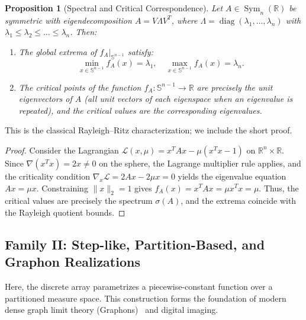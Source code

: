 \documentclass[11pt,a4paper,reqno]{amsart}
\newtheorem{proposition}[theorem]{Proposition}
\theoremstyle{definition}
\numberwithin{equation}{section}
\newcommand{\R}{\mathbb{R}}
\newcommand{\Sph}{\mathbb{S}}
\begin{document}
\begin{proposition}[Spectral and Critical Correspondence]
Let $A \in \operatorname{Sym}_n(\R)$ be symmetric with eigendecomposition $A = V \Lambda V^T$, where $\Lambda = \operatorname{diag}(\lambda_1, \dots, \lambda_n)$ with $\lambda_1 \le \lambda_2 \le \dots \le \lambda_n$. Then:
\begin{enumerate}[label=(\roman*)]
    \item The global extrema of $f_A|_{\Sph^{n-1}}$ satisfy:
    \begin{equation}
        \min_{x \in \Sph^{n-1}} f_A(x) = \lambda_1, \quad \max_{x \in \Sph^{n-1}} f_A(x) = \lambda_n.
    \end{equation}
    \item The critical points of the function $f_A \colon \Sph^{n-1} \to \R$ are precisely the unit eigenvectors of $A$ (all unit vectors of each eigenspace when an eigenvalue is repeated), and the critical values are the corresponding eigenvalues.
\end{enumerate}
\end{proposition}
This is the classical Rayleigh--Ritz characterization; we include the short proof.
\begin{proof}
Consider the Lagrangian $\mathcal{L}(x, \mu) = x^T A x - \mu (x^T x - 1)$ on $\R^n \times \R$. Since $\nabla(x^T x) = 2x \neq 0$ on the sphere, the Lagrange multiplier rule applies, and the criticality condition $\nabla_x \mathcal{L} = 2Ax - 2\mu x = 0$ yields the eigenvalue equation $Ax = \mu x$. Constraining $\|x\|_2 = 1$ gives $f_A(x) = x^T A x = \mu x^T x = \mu$. Thus, the critical values are precisely the spectrum $\sigma(A)$, and the extrema coincide with the Rayleigh quotient bounds.
\end{proof}

\subsection{Family II: Step-like, Partition-Based, and Graphon Realizations}
\label{subsec:fam2}

Here, the discrete array parametrizes a piecewise-constant function over a partitioned measure space. This construction forms the foundation of modern dense graph limit theory (Graphons)~\cite{lovasz2006limits,borgs2008convergent} and digital imaging.
\end{document}

